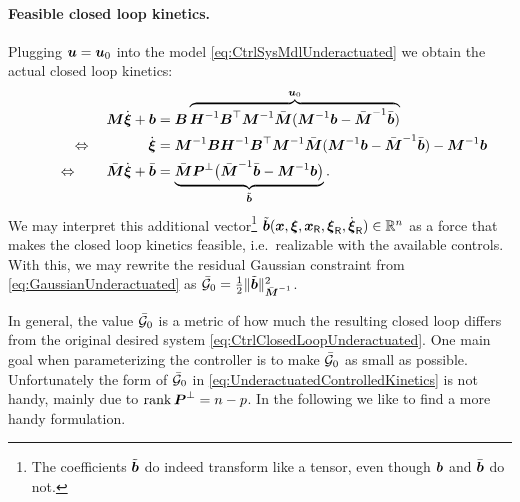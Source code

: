 \paragraph{Feasible closed loop kinetics.}
Plugging $\sysInput = \sysInput_0$ into the model \eqref{eq:CtrlSysMdlUnderactuated} we obtain the actual closed loop kinetics:
\begin{align}\label{eq:UnderactuatedControlledKinetics}
 \sysInertiaMat \sysVeld + \sysForce &= \sysInputMat \overbrace{\mat{H}^{-1} \sysInputMat^\top \sysInertiaMat^{-1} \sysInertiaMatC (\sysInertiaMat^{-1}\sysForce - \sysInertiaMatC^{-1}\sysForceC)}^{\sysInput_0}
\nonumber\\
\Leftrightarrow \qquad \qquad 
 \sysVeld &= \sysInertiaMat^{-1} \sysInputMat \mat{H}^{-1} \sysInputMat^\top \sysInertiaMat^{-1} \sysInertiaMatC (\sysInertiaMat^{-1}\sysForce - \sysInertiaMatC^{-1}\sysForceC) - \sysInertiaMat^{-1} \sysForce
\nonumber\\
\qquad \Leftrightarrow \qquad
 \sysInertiaMatC \sysVeld + \sysForceC &= \underbrace{\sysInertiaMatC \mat{P}^\bot \big( \sysInertiaMatC^{-1} \sysForceC - \sysInertiaMat^{-1} \sysForce \big)}_{\tilde{\sysForce}}.
\end{align}
We may interpret this additional vector\footnote{The coefficients $\tilde{\tuple{b}}$ do indeed transform like a tensor, even though $\sysForce$ and $\sysForceC$ do not.}
$\tilde{\tuple{b}}(\sysCoord, \sysVel, \sysCoordR, \sysVelR, \sysVelRd) \in \RealNum^{\dimConfigSpace}$ as a force that makes the closed loop kinetics feasible, i.e.\ realizable with the available controls.
With this, we may rewrite the residual Gaussian constraint from \eqref{eq:GaussianUnderactuated} as $\GaussianConstraintC_0 = \tfrac{1}{2} \norm[\sysInertiaMatC^{-1}]{\tilde{\sysForce}}^2$.

In general, the value $\GaussianConstraintC_0$ is a metric of how much the resulting closed loop differs from the original desired system \eqref{eq:CtrlClosedLoopUnderactuated}.
One main goal when parameterizing the controller is to make $\GaussianConstraintC_0$ as small as possible.
Unfortunately the form of $\GaussianConstraintC_0$ in \eqref{eq:UnderactuatedControlledKinetics} is not handy, mainly due to $\rank \mat{P}^\bot = \dimConfigSpace - \numInputs$.
In the following we like to find a more handy formulation.


